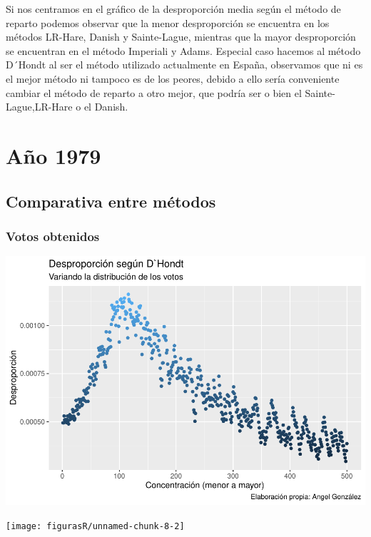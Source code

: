 \documentclass[12pt,a4paper,]{book}
\numberwithin{dummy}{section}
\theoremstyle{ocrenumbox}
\theoremstyle{blacknumex}
\theoremstyle{blacknumbox}
\theoremstyle{ocrenum}
\theoremstyle{ocrenum}
\begin{document}
Si nos centramos en el gráfico de la desproporción media según el método
de reparto podemos observar que la menor desproporción se encuentra en
los métodos LR-Hare, Danish y Sainte-Lague, mientras que la mayor
desproporción se encuentran en el método Imperiali y Adams. Especial
caso hacemos al método D´Hondt al ser el método utilizado actualmente en
España, observamos que ni es el mejor método ni tampoco es de los
peores, debido a ello sería conveniente cambiar el método de reparto a
otro mejor, que podría ser o bien el Sainte-Lague,LR-Hare o el Danish.

\hypertarget{auxf1o-1979}{%
\section{Año 1979}\label{auxf1o-1979}}

\hypertarget{comparativa-entre-muxe9todos-1}{%
\subsection{Comparativa entre
métodos}\label{comparativa-entre-muxe9todos-1}}

\hypertarget{votos-obtenidos-1}{%
\subsubsection{Votos obtenidos}\label{votos-obtenidos-1}}

\begin{center}\includegraphics[width=1\linewidth]{figurasR/unnamed-chunk-8-1} \end{center}

\begin{center}\texttt{[image: figurasR/unnamed-chunk-8-2]} \end{center}
\end{document}
